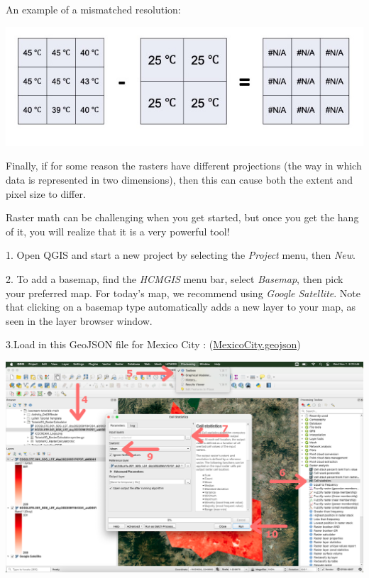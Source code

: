 \documentclass[oneside,a4paper,11pt,explicit]{book}
\begin{document}
\begin{tcolorbox}[enhanced jigsaw,breakable,pad at break*=1mm,
  colback=yellow!5!white,colframe=IceCreamLeaf,title=An Introduction to Raster Math]
   An example of a mismatched resolution:
   
    \vspace{.5em}

    \centerline{\includegraphics[width=\textwidth]{resolution.png}}

    \vspace{.5em}
 
    Finally, if for some reason the rasters have different projections (the way in which data is represented in two dimensions), then this can cause both the extent and pixel size to differ. 

     \vspace{.25em}
 
    Raster math can be challenging when you get started, but once you get the hang of it, you will realize that it is a very powerful tool! 

\end{tcolorbox}

\vspace{.5em}

1. Open QGIS and start a new project by selecting the \textit{Project} menu, then \textit{New}.

2. To add a basemap, find the \textit{HCMGIS} menu bar, select \textit{Basemap}, then pick your preferred map. For today's map, we recommend using \textit{Google Satellite}. Note that clicking on a basemap type automatically adds a new layer to your map, as seen in the layer browser window.

3.Load in this GeoJSON file for Mexico City : (\href{https://jeremydforsythe.github.io/icecream-tutorials/Tutorial8_ESI/MexicoCityPolygon/MexicoCity.geojson}{\small MexicoCity.geojson})

\vspace{.5em}

\centerline{\includegraphics[width=\textwidth]{CellStatistics.png}}
\end{document}
